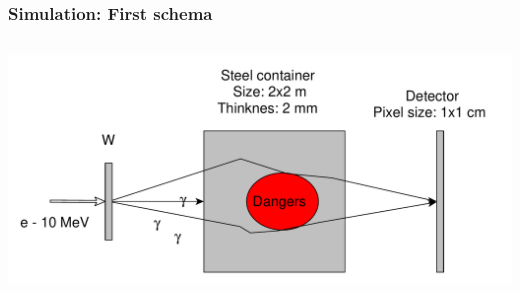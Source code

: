 \documentclass[11pt]{beamer}
\begin{document}
    \begin{frame}
    \frametitle{Simulation: First schema}
    \begin{columns}
%                
        \begin{column}{1\textwidth} 
            \includegraphics[width=1\textwidth]{figures/yed_schema_1.pdf}
        \end{column}
    \end{columns}  
\end{frame}
\end{document}
